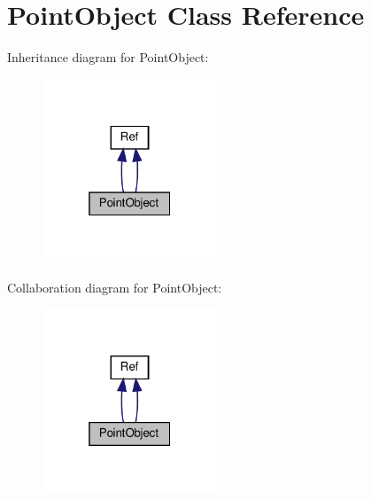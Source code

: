 \hypertarget{classPointObject}{}\section{Point\+Object Class Reference}
\label{classPointObject}


Inheritance diagram for Point\+Object\+:
\nopagebreak
\begin{figure}[H]
\begin{center}
\leavevmode
\includegraphics[width=148pt]{classPointObject__inherit__graph}
\end{center}
\end{figure}


Collaboration diagram for Point\+Object\+:
\nopagebreak
\begin{figure}[H]
\begin{center}
\leavevmode
\includegraphics[width=148pt]{classPointObject__coll__graph}
\end{center}
\end{figure}
